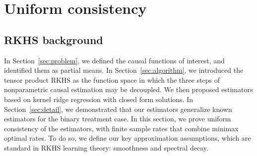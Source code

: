 \section{Uniform consistency}\label{sec:consistency}

\subsection{RKHS background}

In Section~\ref{sec:problem}, we defined the causal functions of interest, and identified them as partial means. In Section~\ref{sec:algorithm}, we introduced the tensor product RKHS as the function space in which the three steps of nonparametric causal estimation may be decoupled. We then proposed estimators based on kernel ridge regression with closed form solutions. In Section~\ref{sec:detail}, we demonstrated that our estimators generalize known estimators for the binary treatment case. In this section, we prove uniform consistency of the estimators, with finite sample rates that combine minimax optimal rates. To do so, we define our key approximation assumptions, which are standard in RKHS learning theory: smoothness and spectral decay.

